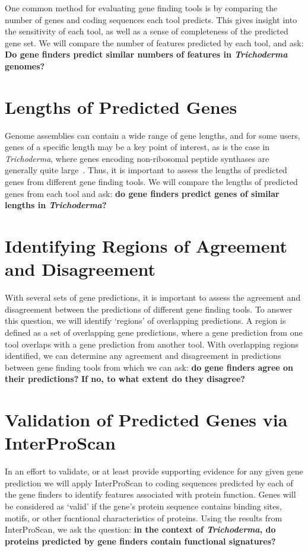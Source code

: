 One common method for evaluating gene finding tools is by comparing the number of genes and coding sequences each tool predicts. This gives insight into the sensitivity of each tool, as well as a sense of completeness of the predicted gene set. We will compare the number of features predicted by each tool, and ask: \textbf{Do gene finders predict similar numbers of features in \textit{Trichoderma} genomes?}

\section{Lengths of Predicted Genes}
\label{rq:gene-lengths}
Genome assemblies can contain a wide range of gene lengths, and for some
users, genes of a specific length may be a key point of interest, as is the case in \textit{Trichoderma}, where genes encoding non-ribosomal peptide synthases are generally quite large~\cite{komaki2020}. Thus, it is important to assess the lengths of predicted genes from different gene finding tools. We will compare the lengths of predicted genes from each tool and ask: \textbf{do gene finders predict genes of similar lengths in \textit{Trichoderma}?}

\section{Identifying Regions of Agreement and Disagreement} 
\label{identify-regions}
With several sets of gene predictions, it is important to assess the agreement and disagreement between the predictions of different gene finding tools. To answer this question, we will identify `regions' of overlapping predictions. A 
region is defined as a set of overlapping gene predictions, where a gene prediction from one tool overlaps with a gene prediction from another tool.
With overlapping regions identified, we can determine any agreement and disagreement in predictions between gene finding tools
from which we can ask: \textbf{do gene finders agree on their
  predictions?} \textbf{If no, to what extent do they disagree?}

\section{Validation of Predicted Genes via InterProScan}
\label{rq:interproscan}
In an effort to validate, or at least provide supporting evidence for
any given gene prediction we will apply InterProScan to coding
sequences predicted by each of the gene finders to identify features
associated with protein function. Genes will be considered as `valid'
if the gene's protein sequence contains binding sites, motifs, or
other fucntional characteristics of proteins. Using the results from
InterProScan, we ask the question: \textbf{in the context of
  \textit{Trichoderma}, do proteins predicted by gene finders contain
  functional signatures?}

